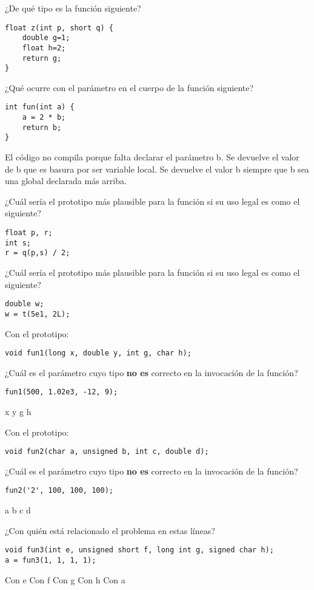 

\begin{preguntas}
\label{sec:tc-funciones-preg}
\question ¿De qué tipo es la función siguiente?
\begin{lstlisting}
float z(int p, short q) {
	double g=1;
	float h=2;
	return g;
}
\end{lstlisting}
\choice {}
\correctchoice {}
\choice {}
\choice {}

\question ¿Qué ocurre con el parámetro  en el cuerpo de la función siguiente?
\begin{lstlisting}
int fun(int a) {
	a = 2 * b;
	return b;
}
\end{lstlisting} 
\choice El código no compila porque falta declarar el parámetro b.
\choice Se devuelve el valor de b que es basura por ser variable local.
\correctchoice Se devuelve el valor b siempre que b sea una global declarada más arriba.

\question ¿Cuál sería el prototipo más plausible para la función  si su uso legal es como el siguiente?
\begin{lstlisting}
float p, r; 
int s;
r = q(p,s) / 2;	
\end{lstlisting}
\correctchoice {}
\choice {}
\choice {}

\question ¿Cuál sería el prototipo más plausible para la función  si su uso legal es como el siguiente?
\begin{lstlisting}
double w;
w = t(5e1, 2L);
\end{lstlisting}
\choice {}
\choice {}
\correctchoice {}
\choice {}

\question Con el prototipo:
\begin{lstlisting}
void fun1(long x, double y, int g, char h);
\end{lstlisting}
¿Cuál es el parámetro cuyo tipo \textbf{no es} correcto en la invocación de la función?
\begin{lstlisting}
fun1(500, 1.02e3, -12, 9);
\end{lstlisting}
\correctchoice x
\choice y
\choice g
\choice h

\question Con el prototipo:
\begin{lstlisting}
void fun2(char a, unsigned b, int c, double d);
\end{lstlisting}
¿Cuál es el parámetro cuyo tipo \textbf{no es} correcto en la invocación de la función?
\begin{lstlisting}
fun2('2', 100, 100, 100);
\end{lstlisting}
\choice a
\choice b
\choice c
\correctchoice d

\question ¿Con quién está relacionado el problema en estas líneas?
\begin{lstlisting}
void fun3(int e, unsigned short f, long int g, signed char h);
a = fun3(1, 1, 1, 1);
\end{lstlisting}
\choice Con e
\choice Con f
\choice Con g
\choice Con h
\correctchoice Con a

\end{preguntas}

